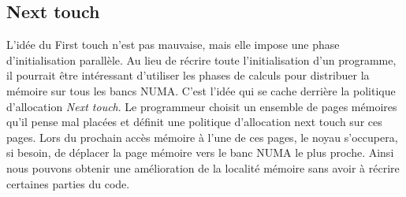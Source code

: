 \subsection{Next touch}
\label{sec:next_touch}
L'idée du First touch n'est pas mauvaise, mais elle impose une phase d'initialisation parallèle.
%
Au lieu de récrire toute l'initialisation d'un programme, il pourrait être intéressant d'utiliser les phases de calculs pour distribuer la mémoire sur tous les bancs NUMA.
%
C'est l'idée qui se cache derrière la politique d'allocation {\em Next touch}.
%
Le programmeur choisit un ensemble de pages mémoires qu'il pense mal placées et définit une politique d'allocation next touch sur ces pages.
%
Lors du prochain accès mémoire à l'une de ces pages, le noyau s'occupera, si besoin, de déplacer la page mémoire vers le banc NUMA le plus proche.
%
Ainsi nous pouvons obtenir une amélioration de la localité mémoire sans avoir à récrire certaines parties du code.
